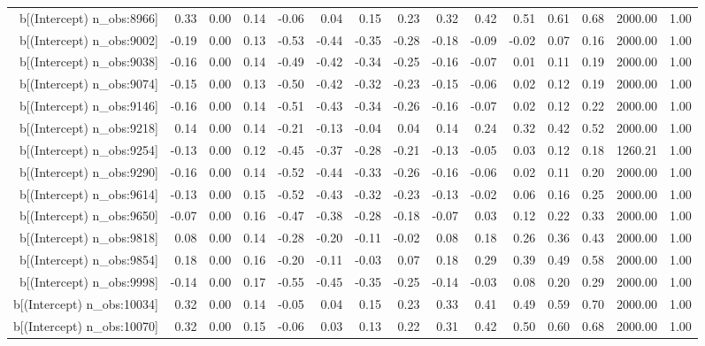 \begin{table}[ht]
\begin{tabular}{rrrrrrrrrrrrrrr}
  b[(Intercept) n\_obs:8966] & 0.33 & 0.00 & 0.14 & -0.06 & 0.04 & 0.15 & 0.23 & 0.32 & 0.42 & 0.51 & 0.61 & 0.68 & 2000.00 & 1.00 \\ 
  b[(Intercept) n\_obs:9002] & -0.19 & 0.00 & 0.13 & -0.53 & -0.44 & -0.35 & -0.28 & -0.18 & -0.09 & -0.02 & 0.07 & 0.16 & 2000.00 & 1.00 \\ 
  b[(Intercept) n\_obs:9038] & -0.16 & 0.00 & 0.14 & -0.49 & -0.42 & -0.34 & -0.25 & -0.16 & -0.07 & 0.01 & 0.11 & 0.19 & 2000.00 & 1.00 \\ 
  b[(Intercept) n\_obs:9074] & -0.15 & 0.00 & 0.13 & -0.50 & -0.42 & -0.32 & -0.23 & -0.15 & -0.06 & 0.02 & 0.12 & 0.19 & 2000.00 & 1.00 \\ 
  b[(Intercept) n\_obs:9146] & -0.16 & 0.00 & 0.14 & -0.51 & -0.43 & -0.34 & -0.26 & -0.16 & -0.07 & 0.02 & 0.12 & 0.22 & 2000.00 & 1.00 \\ 
  b[(Intercept) n\_obs:9218] & 0.14 & 0.00 & 0.14 & -0.21 & -0.13 & -0.04 & 0.04 & 0.14 & 0.24 & 0.32 & 0.42 & 0.52 & 2000.00 & 1.00 \\ 
  b[(Intercept) n\_obs:9254] & -0.13 & 0.00 & 0.12 & -0.45 & -0.37 & -0.28 & -0.21 & -0.13 & -0.05 & 0.03 & 0.12 & 0.18 & 1260.21 & 1.00 \\ 
  b[(Intercept) n\_obs:9290] & -0.16 & 0.00 & 0.14 & -0.52 & -0.44 & -0.33 & -0.26 & -0.16 & -0.06 & 0.02 & 0.11 & 0.20 & 2000.00 & 1.00 \\ 
  b[(Intercept) n\_obs:9614] & -0.13 & 0.00 & 0.15 & -0.52 & -0.43 & -0.32 & -0.23 & -0.13 & -0.02 & 0.06 & 0.16 & 0.25 & 2000.00 & 1.00 \\ 
  b[(Intercept) n\_obs:9650] & -0.07 & 0.00 & 0.16 & -0.47 & -0.38 & -0.28 & -0.18 & -0.07 & 0.03 & 0.12 & 0.22 & 0.33 & 2000.00 & 1.00 \\ 
  b[(Intercept) n\_obs:9818] & 0.08 & 0.00 & 0.14 & -0.28 & -0.20 & -0.11 & -0.02 & 0.08 & 0.18 & 0.26 & 0.36 & 0.43 & 2000.00 & 1.00 \\ 
  b[(Intercept) n\_obs:9854] & 0.18 & 0.00 & 0.16 & -0.20 & -0.11 & -0.03 & 0.07 & 0.18 & 0.29 & 0.39 & 0.49 & 0.58 & 2000.00 & 1.00 \\ 
  b[(Intercept) n\_obs:9998] & -0.14 & 0.00 & 0.17 & -0.55 & -0.45 & -0.35 & -0.25 & -0.14 & -0.03 & 0.08 & 0.20 & 0.29 & 2000.00 & 1.00 \\ 
  b[(Intercept) n\_obs:10034] & 0.32 & 0.00 & 0.14 & -0.05 & 0.04 & 0.15 & 0.23 & 0.33 & 0.41 & 0.49 & 0.59 & 0.70 & 2000.00 & 1.00 \\ 
  b[(Intercept) n\_obs:10070] & 0.32 & 0.00 & 0.15 & -0.06 & 0.03 & 0.13 & 0.22 & 0.31 & 0.42 & 0.50 & 0.60 & 0.68 & 2000.00 & 1.00 \\ 

\end{tabular}
\end{table}
